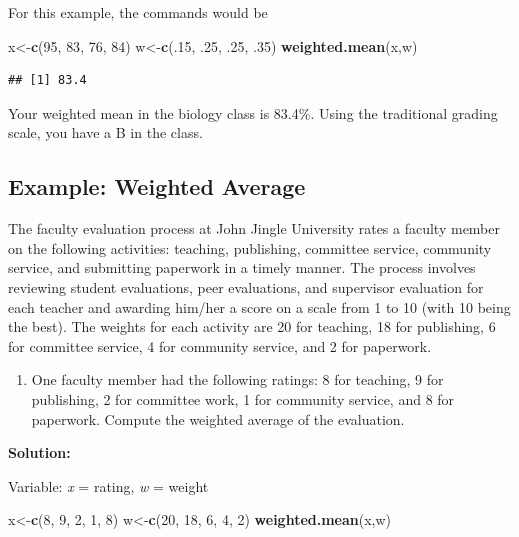 \documentclass[]{book}
\newenvironment{Shaded}{\begin{snugshade}}{\end{snugshade}}
\newcommand{\DecValTok}[1]{\textcolor[rgb]{0.00,0.00,0.81}{#1}}
\newcommand{\FloatTok}[1]{\textcolor[rgb]{0.00,0.00,0.81}{#1}}
\newcommand{\KeywordTok}[1]{\textcolor[rgb]{0.13,0.29,0.53}{\textbf{#1}}}
\newcommand{\NormalTok}[1]{#1}
\providecommand{\tightlist}{%
  \setlength{\itemsep}{0pt}\setlength{\parskip}{0pt}}
\begin{document}
For this example, the commands would be

\begin{Shaded}
\begin{Highlighting}[]
\NormalTok{x<-}\KeywordTok{c}\NormalTok{(}\DecValTok{95}\NormalTok{, }\DecValTok{83}\NormalTok{, }\DecValTok{76}\NormalTok{, }\DecValTok{84}\NormalTok{)}
\NormalTok{w<-}\KeywordTok{c}\NormalTok{(.}\DecValTok{15}\NormalTok{, }\FloatTok{.25}\NormalTok{, }\FloatTok{.25}\NormalTok{, }\FloatTok{.35}\NormalTok{)}
\KeywordTok{weighted.mean}\NormalTok{(x,w)}
\end{Highlighting}
\end{Shaded}

\begin{verbatim}
## [1] 83.4
\end{verbatim}

Your weighted mean in the biology class is 83.4\%. Using the traditional grading scale, you have a B in the class.

\hypertarget{example-weighted-average-1}{%
\subsection{Example: Weighted Average}\label{example-weighted-average-1}}

The faculty evaluation process at John Jingle University rates a faculty member on the following activities: teaching, publishing, committee service, community service, and submitting paperwork in a timely manner. The process involves reviewing student evaluations, peer evaluations, and supervisor evaluation for each teacher and awarding him/her a score on a scale from 1 to 10 (with 10 being the best). The weights for each activity are 20 for teaching, 18 for publishing, 6 for committee service, 4 for community service, and 2 for paperwork.

\begin{enumerate}
\def\labelenumi{\alph{enumi})}
\tightlist
\item
  One faculty member had the following ratings: 8 for teaching, 9 for publishing, 2 for committee work, 1 for community service, and 8 for paperwork. Compute the weighted average of the evaluation.
\end{enumerate}

\textbf{Solution:}

Variable: \emph{x} = rating, \emph{w} = weight

\begin{Shaded}
\begin{Highlighting}[]
\NormalTok{x<-}\KeywordTok{c}\NormalTok{(}\DecValTok{8}\NormalTok{, }\DecValTok{9}\NormalTok{, }\DecValTok{2}\NormalTok{, }\DecValTok{1}\NormalTok{, }\DecValTok{8}\NormalTok{)}
\NormalTok{w<-}\KeywordTok{c}\NormalTok{(}\DecValTok{20}\NormalTok{, }\DecValTok{18}\NormalTok{, }\DecValTok{6}\NormalTok{, }\DecValTok{4}\NormalTok{, }\DecValTok{2}\NormalTok{)}
\KeywordTok{weighted.mean}\NormalTok{(x,w)}
\end{Highlighting}
\end{Shaded}
\end{document}
